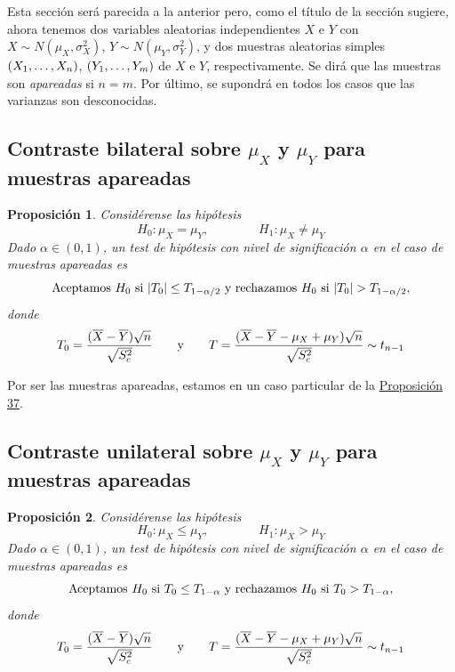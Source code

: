 \documentclass[11pt]{report}
\makeatletter
\renewenvironment{proof}[1][\proofname]{\par
  \pushQED{\qed}%
  \normalfont \topsep\z@skip %
  \trivlist
  \item[\hskip\labelsep
        \itshape
    #1\@addpunct{.}]\ignorespaces
}{%
  \popQED\endtrivlist\@endpefalse
}
\newtheorem{proposition}{Proposición}
\theoremstyle{definition}
\makeatother
\begin{document}
Esta sección será parecida a la anterior pero, como el título de la sección sugiere, ahora tenemos dos variables aleatorias independientes $X$ e $Y$ con $X \sim N(\mu_X,\sigma^2_X)$, $Y \sim N(\mu_Y,\sigma^2_Y)$, y dos muestras aleatorias simples $(X_1,\mathellipsis,X_n)$, $(Y_1,\mathellipsis,Y_m)$ de $X$ e $Y$, respectivamente. Se dirá que las muestras son \emph{apareadas} si $n=m$. Por último, se supondrá en todos los casos que las varianzas son desconocidas.

\subsection{Contraste bilateral sobre \texorpdfstring{$\mu_X$}{TEXT} y \texorpdfstring{$\mu_Y$}{TEXT} para muestras apareadas}


\begin{proposition}
    Considérense las hipótesis
    \[H_0 \colon \mu_X=\mu_Y, \qquad \qquad H_1 \colon \mu_X\neq \mu_Y\]
    Dado $\alpha \in (0,1)$, un test de hipótesis con nivel de significación $\alpha$ en el caso de muestras apareadas es
    \[\textup{{Aceptamos} } H_0 \textup{ {si} } |T_0| \leq T_{1-\alpha/2} \textup{ {y rechazamos} } H_0 \textup{ {si} } |T_0| > T_{1-\alpha/2},\]
    donde
    \[T_0 = \frac{(\overline{X}-\overline{Y})\sqrt{n}}{\sqrt{S^2_c}} \qquad \textup{y} \qquad T = \frac{(\overline{X}-\overline{Y}-\mu_X+\mu_Y)\sqrt{n}}{\sqrt{S^2_c}} \sim t_{n-1}\]
\end{proposition}

\begin{proof}
    Por ser las muestras apareadas, estamos en un caso particular de la \hyperref[prop37]{\color{blue}Proposición 37}.
\end{proof}

\subsection{Contraste unilateral sobre \texorpdfstring{$\mu_X$}{TEXT} y \texorpdfstring{$\mu_Y$}{TEXT} para muestras apareadas}

\begin{proposition}
    Considérense las hipótesis
    \[H_0 \colon \mu_X \leq \mu_Y, \qquad \qquad H_1 \colon \mu_X > \mu_Y\]
    Dado $\alpha \in (0,1)$, un test de hipótesis con nivel de significación $\alpha$ en el caso de muestras apareadas es
    \[\textup{{Aceptamos} } H_0 \textup{ {si} } T_0 \leq T_{1-\alpha} \textup{ {y rechazamos} } H_0 \textup{ {si} } T_0 > T_{1-\alpha},\]
    donde
    \[T_0 = \frac{(\overline{X}-\overline{Y})\sqrt{n}}{\sqrt{S^2_c}} \qquad \textup{y} \qquad T = \frac{(\overline{X}-\overline{Y}-\mu_X+\mu_Y)\sqrt{n}}{\sqrt{S^2_c}} \sim t_{n-1}\]
\end{proposition}
\end{document}
